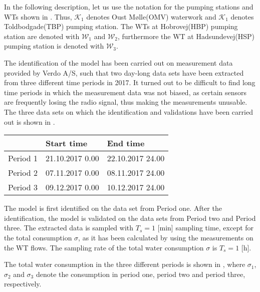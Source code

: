 In the following description, let us use the notation for the pumping stations and WTs shown in . Thus, $\mathcal{K}_1$ denotes Oust Mølle(OMV) waterwork and $\mathcal{K}_1$ denotes Toldbodgade(TBP) pumping station. The WTs at Hobrovej(HBP) pumping station are denoted with $\mathcal{W}_1$ and $\mathcal{W}_2$, furthermore the WT at Hadsundevej(HSP) pumping station is denoted with $\mathcal{W}_3$. 

The identification of the model has been carried out on measurement data provided by Verdo A/S, such that two day-long data sets have been extracted from three different time periods in 2017. It turned out to be difficult to find long time periods in which the measurement data was not biased, as certain sensors are frequently losing the radio signal, thus making the measurements unusable. The three data sets on which the identification and validations have been carried out is shown in .

\begin{center}
    \begin{tabular}{ | p{3cm} | p{3cm} | p{3cm} |}
    \hline
     & \textbf{Start time} & \textbf{End time} \\ 
    \hline
    Period 1 & 21.10.2017 0.00 &  22.10.2017 24.00 \\ 
    \hline
    Period 2 & 07.11.2017 0.00 & 08.11.2017 24.00  \\ 
    \hline
    Period 3 & 09.12.2017 0.00 & 10.12.2017 24.00 \\ 
    \hline
    \end{tabular}
    \label{identification_periods}
\end{center}

\vspace{-3mm}

The model is first identified on the data set from Period one. After the identification, the model is validated on the data sets from Period two and Period three. The extracted data is sampled with $T_s = 1$ [min] sampling time, except for the total consumption $\sigma$, as it has been calculated by using the measurements on the WT flows. The sampling rate of the total water consumption $\sigma$ is $T_s = 1$ [h]. 

The total water consumption in the three different periods is shown in , where $\sigma_1$, $\sigma_2$ and $\sigma_3$ denote the consumption in period one, period two and period three, respectively.

